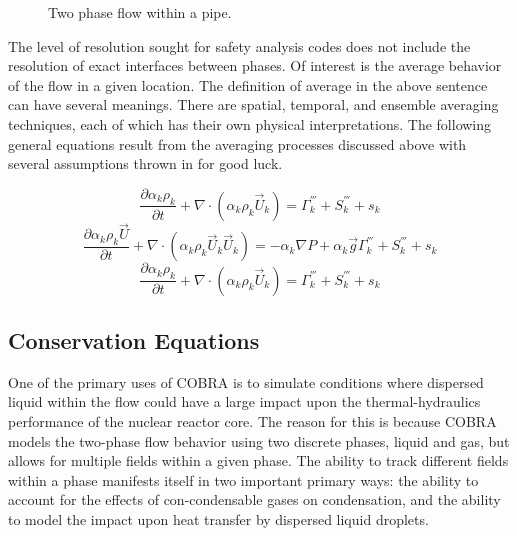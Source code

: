 \begin{figure}[ht]
\caption{Two phase flow within a pipe.}
\label{fig:pipe_with_bubbles}
\begin{center}
\end{center}
\end{figure}

The level of resolution sought for safety analysis codes does not include the resolution of exact interfaces between phases.
Of interest is the average behavior of the flow in a given location.
The definition of average in the above sentence can have several meanings.
There are spatial, temporal, and ensemble averaging techniques, each of which has their own physical interpretations\cite{Drew1998, Todreas2011}.
The following general equations result from the averaging processes discussed above with several assumptions thrown in for good luck.

\begin{equation}
\label{eqn:conservation_of_mass}
\frac{\partial \alpha_k \rho_k }{\partial t } + \nabla \cdot \left( \alpha_k \rho_k \vec{U}_k \right) = \Gamma^{'''}_k + S^{'''}_k + s_k
\end{equation}
\begin{equation}
\label{eqn:conservation_of_momentum}
\frac{\partial \alpha_k \rho_k \vec{U} }{\partial t } + \nabla \cdot \left( \alpha_k \rho_k \vec{U}_k \vec{U}_k \right) = -\alpha_k \nabla P + \alpha_k \vec{g} \Gamma^{'''}_k + S^{'''}_k + s_k
\end{equation}
\begin{equation}
\label{eqn:conservation_of_energy}
\frac{\partial \alpha_k \rho_k }{\partial t } + \nabla \cdot \left( \alpha_k \rho_k \vec{U}_k \right) = \Gamma^{'''}_k + S^{'''}_k + s_k
\end{equation}

\subsection{Conservation Equations}
One of the primary uses of COBRA is to simulate conditions where dispersed liquid within the flow could have a large impact upon the thermal-hydraulics performance of the nuclear reactor core.
The reason for this is because COBRA models the two-phase flow behavior using two discrete phases, liquid and gas, but allows for multiple fields within a given phase.
The ability to track different fields within a phase manifests itself in two important primary ways: the ability to account for the effects of con-condensable gases on condensation, and the ability to model the impact upon heat transfer by dispersed liquid droplets.


